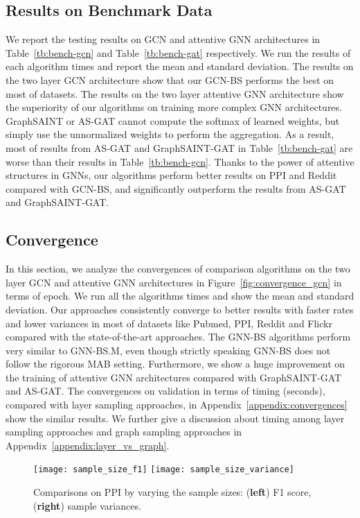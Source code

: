 \documentclass{article}
\begin{document}
\subsection{Results on Benchmark Data}\label{sec:benchmark}
We report the testing results on GCN and attentive
GNN architectures in Table~\ref{tb:bench-gcn} and 
Table~\ref{tb:bench-gat} respectively.
We run the results of each algorithm  times and
report the mean and standard deviation.
The results on the two layer GCN architecture show that our
GCN-BS performs the best on most of datasets. 
The results on the two layer attentive GNN architecture show
the superiority of our algorithms on training more complex
GNN architectures. GraphSAINT or AS-GAT cannot compute 
the softmax of learned weights, but
simply use the unnormalized weights to perform the aggregation.
As a result, most of results from AS-GAT and GraphSAINT-GAT
in Table~\ref{tb:bench-gat} are worse than their results
in Table~\ref{tb:bench-gcn}. Thanks to the power of 
attentive structures in GNNs, our algorithms perform
better results on PPI and Reddit compared with
GCN-BS, and significantly outperform the results from 
AS-GAT and GraphSAINT-GAT.






\subsection{Convergence}
In this section, we analyze the convergences of 
comparison algorithms on the two layer GCN and 
attentive GNN architectures in Figure~\ref{fig:convergence_gcn} 
in terms of epoch.
We run all the algorithms  times and show the mean and standard 
deviation.
Our approaches consistently converge to better results 
with faster rates and lower variances in most of
datasets like Pubmed, PPI, Reddit and Flickr compared with
the state-of-the-art approaches.
The GNN-BS algorithms perform very similar to GNN-BS.M, even though
strictly speaking GNN-BS does not follow the rigorous MAB setting.
Furthermore, we show a huge improvement on the training
of attentive GNN architectures compared with GraphSAINT-GAT
and AS-GAT.
The convergences on validation in terms of 
timing (seconds), compared with layer sampling
approaches, in Appendix~\ref{appendix:convergences} 
show the similar results. 
We further give a discussion about timing
among layer sampling approaches and graph sampling approaches
in Appendix~\ref{appendix:layer_vs_graph}.


\begin{figure}[h]
\texttt{[image: sample\_size\_f1]}
\texttt{[image: sample\_size\_variance]}
\caption{Comparisons on PPI by varying the sample sizes: 
(\textbf{left}) F1 score, (\textbf{right}) sample variances.}
\label{fig:sample_size}
\end{figure}
\end{document}
